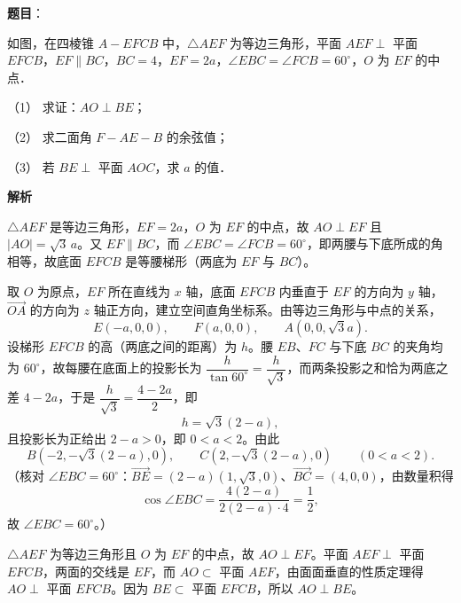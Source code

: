 \begin{answer}

\textbf{题目}：

如图，在四棱锥 \(A-EFCB\) 中，\(\triangle AEF\) 为等边三角形，平面 \(AEF\perp\) 平面 \(EFCB\)，\(EF\parallel BC\)，\(BC=4\)，\(EF=2a\)，\(\angle EBC=\angle FCB=60^\circ\)，\(O\) 为 \(EF\) 的中点．
\nopagebreak[4]
\begin{center}\end{center}
\nopagebreak[4]
（1） 求证：\(AO\perp BE\)；

（2） 求二面角 \(F-AE-B\) 的余弦值；

（3） 若 \(BE\perp\) 平面 \(AOC\)，求 \(a\) 的值．

\textbf{解析}

\(\triangle AEF\) 是等边三角形，\(EF=2a\)，\(O\) 为 \(EF\) 的中点，故 \(AO\perp EF\) 且 \(|AO|=\sqrt{3}\,a\)。又 \(EF\parallel BC\)，而 \(\angle EBC=\angle FCB=60^{\circ}\)，即两腰与下底所成的角相等，故底面 \(EFCB\) 是等腰梯形（两底为 \(EF\) 与 \(BC\)）。

取 \(O\) 为原点，\(EF\) 所在直线为 \(x\) 轴，底面 \(EFCB\) 内垂直于 \(EF\) 的方向为 \(y\) 轴，\(\overrightarrow{OA}\) 的方向为 \(z\) 轴正方向，建立空间直角坐标系。由等边三角形与中点的关系，
\nopagebreak[4]
\[
E(-a,0,0),\qquad F(a,0,0),\qquad A(0,0,\sqrt{3}a).
\]
设梯形 \(EFCB\) 的高（两底之间的距离）为 \(h\)。腰 \(EB\)、\(FC\) 与下底 \(BC\) 的夹角均为 \(60^{\circ}\)，故每腰在底面上的投影长为 \(\dfrac{h}{\tan 60^{\circ}}=\dfrac{h}{\sqrt{3}}\)，而两条投影之和恰为两底之差 \(4-2a\)，于是 \(\dfrac{h}{\sqrt{3}}=\dfrac{4-2a}{2}\)，即
\nopagebreak[4]
\[
h=\sqrt{3}(2-a),
\]
且投影长为正给出 \(2-a>0\)，即 \(0<a<2\)。由此
\nopagebreak[4]
\[
B\left(-2,-\sqrt{3}(2-a),0\right),\qquad C\left(2,-\sqrt{3}(2-a),0\right)\qquad(0<a<2).
\]
（核对 \(\angle EBC=60^{\circ}\)：\(\overrightarrow{BE}=(2-a)(1,\sqrt{3},0)\)、\(\overrightarrow{BC}=(4,0,0)\)，由数量积得
\nopagebreak[4]
\[
\cos\angle EBC=\frac{4(2-a)}{2(2-a)\cdot 4}=\frac{1}{2},
\]
故 \(\angle EBC=60^{\circ}\)。）


\(\triangle AEF\) 为等边三角形且 \(O\) 为 \(EF\) 的中点，故 \(AO\perp EF\)。平面 \(AEF\perp\) 平面 \(EFCB\)，两面的交线是 \(EF\)，而 \(AO\subset\) 平面 \(AEF\)，由面面垂直的性质定理得 \(AO\perp\) 平面 \(EFCB\)。因为 \(BE\subset\) 平面 \(EFCB\)，所以 \(AO\perp BE\)。


\end{answer}
